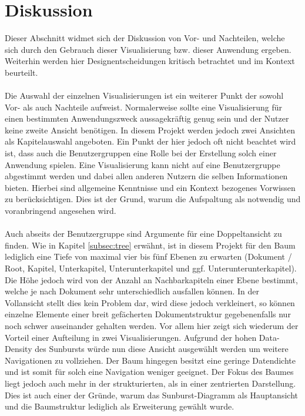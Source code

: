 \section{Diskussion}
Dieser Abschnitt widmet sich der Diskussion von Vor- und Nachteilen, welche sich durch den Gebrauch dieser Visualisierung bzw. dieser Anwendung ergeben. Weiterhin werden hier Designentscheidungen kritisch betrachtet und im Kontext beurteilt.\\
\\
Die Auswahl der einzelnen Visualisierungen ist ein weiterer Punkt der sowohl Vor- als auch Nachteile aufweist. Normalerweise sollte eine Visualisierung f\"ur einen bestimmten Anwendungszweck aussagekr\"aftig genug sein und der Nutzer keine zweite Ansicht ben\"otigen. In diesem Projekt werden jedoch zwei Ansichten als Kapitelauswahl angeboten. Ein Punkt der hier jedoch oft nicht beachtet wird ist, dass auch die Benutzergruppen eine Rolle bei der Erstellung solch einer Anwendung spielen. Eine Visualisierung kann nicht auf eine Benutzergruppe abgestimmt werden und dabei allen anderen Nutzern die selben Informationen bieten. Hierbei sind allgemeine Kenntnisse und ein Kontext bezogenes Vorwissen zu ber\"ucksichtigen. Dies ist der Grund, warum die Aufspaltung als notwendig und voranbringend angesehen wird.\\
\\
Auch abseits der Benutzergruppe sind Argumente f\"ur eine Doppeltansicht zu finden. Wie in Kapitel \ref{subsec:tree} erw\"ahnt, ist in diesem Projekt f\"ur den Baum lediglich eine Tiefe von maximal vier bis f\"unf Ebenen zu erwarten (Dokument / Root, Kapitel, Unterkapitel, Unterunterkapitel und ggf. Unterunterunterkapitel). Die H\"ohe jedoch wird von der Anzahl an Nachbarkapiteln einer Ebene bestimmt, welche je nach Dokument sehr unterschiedlich ausfallen k\"onnen. In der Vollansicht stellt dies kein Problem dar, wird diese jedoch verkleinert, so k\"onnen einzelne Elemente einer breit gef\"acherten Dokumentstruktur gegebenenfalls nur noch schwer auseinander gehalten werden. Vor allem hier zeigt sich wiederum der Vorteil einer Aufteilung in zwei Visualisierungen. Aufgrund der hohen Data-Density des Sunbursts w\"urde nun diese Ansicht ausgew\"ahlt werden um weitere Navigationen zu vollziehen. Der Baum hingegen besitzt eine geringe Datendichte und ist somit f\"ur solch eine Navigation weniger geeignet. Der Fokus des Baumes liegt jedoch auch mehr in der strukturierten, als in einer zentrierten Darstellung. Dies ist auch einer der Gr\"unde, warum das Sunburst-Diagramm als Hauptansicht und die Baumstruktur lediglich als Erweiterung gew\"ahlt wurde.\\
\\

